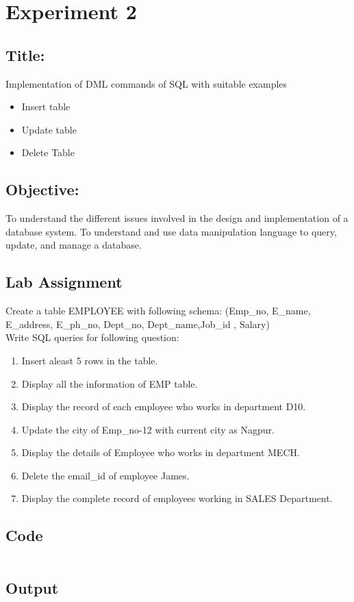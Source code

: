 \documentclass{article}
\begin{document}
\section*{Experiment 2}
\subsection*{\textbf{Title:}} Implementation of DML commands of SQL with suitable examples
\begin{itemize}
	\item Insert table
	\item Update table
	\item Delete Table
\end{itemize}
\subsection*{\textbf{Objective:}} To understand the different issues involved in the design and implementation of a database system.
To understand and use data manipulation language to query, update, and manage a
database.
\subsection*{Lab Assignment}
Create a table EMPLOYEE with following schema: (Emp_no, E_name, E_address, E_ph_no, Dept_no, Dept_name,Job_id , Salary)\\
Write SQL queries for following question:
\begin{enumerate}
	\item Insert aleast 5 rows in the table.
	\item Display all the information of EMP table.
	\item Display the record of each employee who works in department D10.
	\item Update the city of Emp_no-12 with current city as Nagpur.
	\item Display the details of Employee who works in department MECH.
	\item Delete the email_id of employee James.
	\item Display the complete record of employees working in SALES Department.
\end{enumerate}
\subsection*{Code}
\inputminted{sql}{code/2.sql}
\subsection*{Output}

\end{document}
